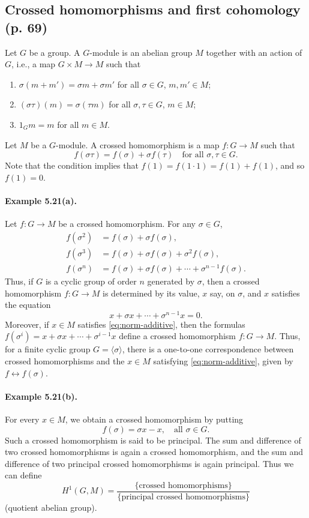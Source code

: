 \subsection*{Crossed homomorphisms and first cohomology (p. 69)}
Let $G$ be a group. A $G$-module is an abelian group $M$ together with an action of $G$, i.e., a map $G\times M\to M$ such that
\begin{enumerate}[label=(\alph*)]
\item $\sigma(m+m')=\sigma m+\sigma m'$ for all $\sigma\in G$, $m,m'\in M$;
\item $(\sigma\tau)(m)=\sigma(\tau m)$ for all $\sigma,\tau\in G$, $m\in M$;
\item $1_Gm=m$ for all $m\in M$.
\end{enumerate}
Let $M$ be a $G$-module. A crossed homomorphism is a map $f:G\to M$ such that
\[
f(\sigma\tau)=f(\sigma)+\sigma f(\tau)\quad\text{for all }\sigma,\tau\in G.
\]
Note that the condition implies that $f(1)=f(1\cdot1)=f(1)+f(1)$, and so $f(1)=0$.

\paragraph{Example 5.21(a).}
Let $f:G\to M$ be a crossed homomorphism. For any $\sigma\in G$,
\begin{align*}
f(\sigma^2)&=f(\sigma)+\sigma f(\sigma),\\
f(\sigma^3)&=f(\sigma)+\sigma f(\sigma)+\sigma^2 f(\sigma),\\
f(\sigma^n)&=f(\sigma)+\sigma f(\sigma)+\cdots+\sigma^{n-1}f(\sigma).
\end{align*}
Thus, if $G$ is a cyclic group of order $n$ generated by $\sigma$, then a crossed homomorphism $f:G\to M$ is determined by its value, $x$ say, on $\sigma$, and $x$ satisfies the equation
\begin{equation}\label{eq:norm-additive}
x+\sigma x+\cdots+\sigma^{n-1}x=0.
\end{equation}
Moreover, if $x\in M$ satisfies \eqref{eq:norm-additive}, then the formulas
$f(\sigma^i)=x+\sigma x+\cdots+\sigma^{i-1}x$ define a crossed homomorphism $f:G\to M$. Thus, for a finite cyclic group $G=\langle\sigma\rangle$, there is a one-to-one correspondence between crossed homomorphisms and the $x\in M$ satisfying \eqref{eq:norm-additive}, given by $f\leftrightarrow f(\sigma)$.

\paragraph{Example 5.21(b).}
For every $x\in M$, we obtain a crossed homomorphism by putting
\[
f(\sigma)=\sigma x-x,\quad\text{all }\sigma\in G.
\]
Such a crossed homomorphism is said to be principal. The sum and difference of two crossed homomorphisms is again a crossed homomorphism, and the sum and difference of two principal crossed homomorphisms is again principal. Thus we can define
\[
H^1(G,M)=\frac{\{\text{crossed homomorphisms}\}}{\{\text{principal crossed homomorphisms}\}}
\]
(quotient abelian group).


